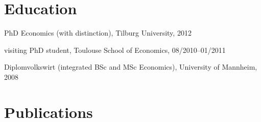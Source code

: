 \documentclass[a4paper]{article}
\renewenvironment{itemize}{
  \begin{list}{}{
    \setlength{\leftmargin}{1.5em}
  }
}{
  \end{list}
}
\begin{document}
\section*{Education}

\begin{itemize}
   \item PhD Economics (with distinction), Tilburg University, 2012

   \item visiting PhD student, Toulouse School of Economics, 08/2010--01/2011

   \item Diplomvolkswirt (integrated BSc and MSc Economics), University of Mannheim, 2008
\end{itemize}


\section*{Publications}
\end{document}
